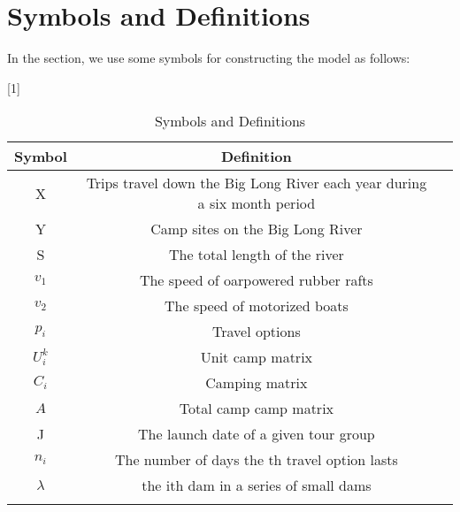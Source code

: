 \section{Symbols and Definitions }
In the section, we use some symbols for constructing the model as follows: 

\begin{table}[H]
	\centering
	\caption{\label{tab:Symbols}Symbols and Definitions}
	\scalebox{0.93}[1]{%
	\begin{tabular}{c c r}
		\Xhline{1.2pt}
		Symbol  & Deﬁnition \\
		\midrule
		X &  Trips travel down the Big Long River each year during a six month period \\
		Y &  Camp sites on the Big Long River \\
		S &  The total length of the river \\
		${v_1}$ &  The speed of oarpowered rubber rafts \\
		${v_2}$ &  The speed of motorized boats \\
		${p_i}$ &  Travel options \\
		$U_i^k$ &  Unit camp matrix \\
		${C_i}$ &  Camping matrix \\
		$A$ &  Total camp camp matrix \\
		J &  The launch date of a given tour group \\
		${n_i}$ &  The number of days the  th travel option lasts \\
		$\lambda $ &  the ith dam in a series of small dams \\
		\Xhline{1.2pt}
	\end{tabular}
}
\end{table}